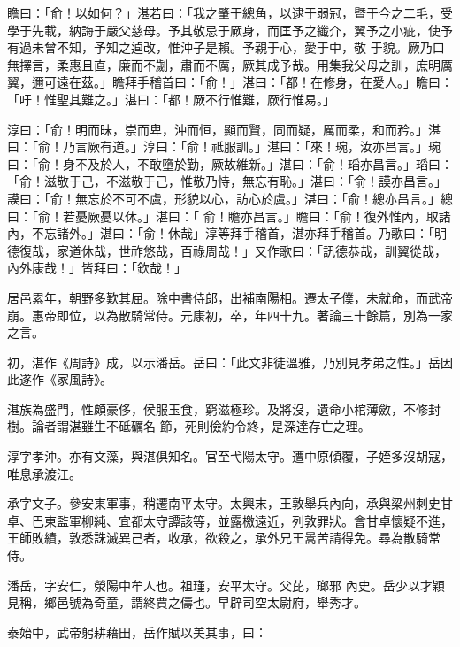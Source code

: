 \begin{pinyinscope}
 瞻曰：「俞！以如何？」湛若曰：「我之肇于總角，以逮于弱冠，暨于今之二毛，受學于先載，納誨于嚴父慈母。予其敬忌于厥身，而匡予之纖介，翼予之小疵，使予有過未曾不知，予知之逌改，惟沖子是賴。予親于心，愛于中，敬
 于貌。厥乃口無擇言，柔惠且直，廉而不劌，肅而不厲，厥其成予哉。用集我父母之訓，庶明厲翼，邇可遠在茲。」瞻拜手稽首曰：「俞！」湛曰：「都！在修身，在愛人。」瞻曰：「吁！惟聖其難之。」湛曰：「都！厥不行惟難，厥行惟易。」



 淳曰：「俞！明而昧，崇而卑，沖而恒，顯而賢，同而疑，厲而柔，和而矜。」湛曰：「俞！乃言厥有道。」淳曰：「俞！祗服訓。」湛曰：「來！琬，汝亦昌言。」琬曰：「俞！身不及於人，不敢墮於勤，厥故維新。」湛曰：「俞！瑫亦昌言。」瑫曰：「俞！滋敬于己，不滋敬于己，惟敬乃恃，無忘有恥。」湛曰：「俞！謨亦昌言。」謨曰：「俞！無忘於不可不虞，形貌以心，訪心於虞。」湛曰：「俞！總亦昌言。」總曰：「俞！若憂厥憂以休。」湛曰：「
 俞！瞻亦昌言。」瞻曰：「俞！復外惟內，取諸內，不忘諸外。」湛曰：「俞！休哉」淳等拜手稽首，湛亦拜手稽首。乃歌曰：「明德復哉，家道休哉，世祚悠哉，百祿周哉！」又作歌曰：「訊德恭哉，訓翼從哉，內外康哉！」皆拜曰：「欽哉！」



 居邑累年，朝野多歎其屈。除中書侍郎，出補南陽相。遷太子僕，未就命，而武帝崩。惠帝即位，以為散騎常侍。元康初，卒，年四十九。著論三十餘篇，別為一家之言。



 初，湛作《周詩》成，以示潘岳。岳曰：「此文非徒溫雅，乃別見孝弟之性。」岳因此遂作《家風詩》。



 湛族為盛門，性頗豪侈，侯服玉食，窮滋極珍。及將沒，遺命小棺薄斂，不修封樹。論者謂湛雖生不砥礪名
 節，死則儉約令終，是深達存亡之理。



 淳字孝沖。亦有文藻，與湛俱知名。官至弋陽太守。遭中原傾覆，子姪多沒胡寇，唯息承渡江。



 承字文子。參安東軍事，稍遷南平太守。太興末，王敦舉兵內向，承與梁州刺史甘卓、巴東監軍柳純、宜都太守譚該等，並露檄遠近，列敦罪狀。會甘卓懷疑不進，王師敗績，敦悉誅滅異己者，收承，欲殺之，承外兄王暠苦請得免。尋為散騎常侍。



 潘岳，字安仁，滎陽中牟人也。祖瑾，安平太守。父芘，瑯邪
 內史。岳少以才穎見稱，鄉邑號為奇童，謂終賈之儔也。早辟司空太尉府，舉秀才。



 泰始中，武帝躬耕藉田，岳作賦以美其事，曰：



\end{pinyinscope}
